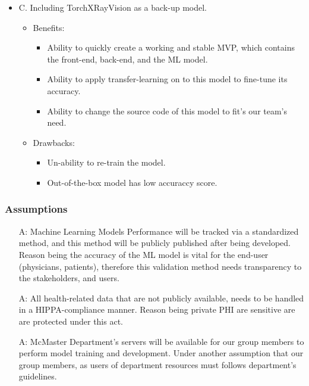 \documentclass[12pt]{article}
\newcounter{assumpnum} %
\begin{document}
\begin{itemize}
\item C. Including TorchXRayVision as a back-up model.
    \begin{itemize}
        \item Benefits:
        \begin{itemize}
            \item Ability to quickly create a working and stable MVP, which contains the front-end, back-end, and the ML model.
            \item Ability to apply transfer-learning on to this model to fine-tune its accuracy.
            \item Ability to change the source code of this model to fit's our team's need.
        \end{itemize}
        \item Drawbacks:
        \begin{itemize}
            \item Un-ability to re-train the model.
            \item Out-of-the-box model has low accuraccy score.
        \end{itemize}
    \end{itemize}
\end{itemize}
\subsubsection{Assumptions} \label{sec_assumpt}
\begin{itemize}

\item[A\refstepcounter{assumpnum}\theassumpnum \label{A_meaningfulLabel}:] Machine Learning Models Performance will be tracked via a standardized method, and this method will be publicly published after being developed. Reason being the accuracy of the ML model is vital for the end-user (physicians, patients), therefore this validation method needs transparency to the stakeholders, and users.
\item[A\refstepcounter{assumpnum}\theassumpnum \label{A_meaningfulLabel}:] All health-related data that are not publicly available, needs to be handled in a HIPPA-compliance manner. Reason being private PHI are sensitive are are protected under this act.
\item[A\refstepcounter{assumpnum}\theassumpnum \label{A_meaningfulLabel}:] McMaster Department's servers will be available for our group members to perform model training and development. Under another assumption that our group members, as users of department resources must follows department's guidelines.

\end{itemize}
\end{document}
